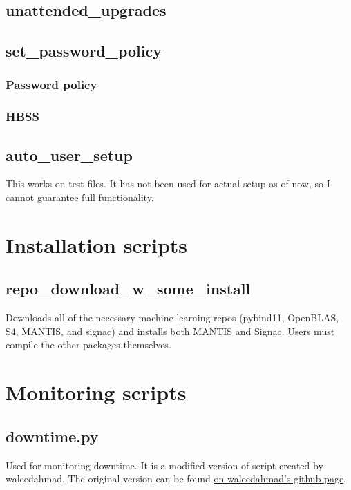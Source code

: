 \documentclass[10pt,letterpaper]{report}
\begin{document}
\section{unattended\_upgrades}		\label{sec:mandatoryautoupgrades}
	

\section{set\_password\_policy} 		\label{sec:passwd}
\subsection{Password policy} 		\label{subsec:passwdpolicy}
	
\subsection{HBSS}			\label{subsec:HBSS}
	

\section{auto\_user\_setup}		\label{sec:users}
This works on test files. It has not been used for actual setup as of now, so I cannot guarantee full functionality.

\chapter{Installation scripts}		\label{ch:install}

\section{repo\_download\_w\_some\_install}	\label{sec:repoDL}
Downloads all of the necessary machine learning repos (pybind11, OpenBLAS, S4, MANTIS, and signac) and installs both MANTIS and Signac. Users must compile the other packages themselves.

	

\chapter{Monitoring scripts}		\label{ch:monitor}

\section{downtime.py}			\label{sec:downtime}
Used for monitoring downtime. It is a modified version of script created by waleedahmad. The original version can be found \href{https://gist.github.com/waleedahmad/326ec53f76646dccec299910a7fb4f2b}{on waleedahmad's github page}.



\end{document}
